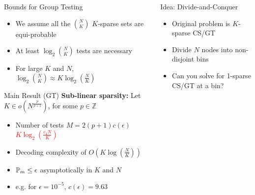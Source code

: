 \documentclass[final]{beamer}
\newlength{\onecolwid}
\newlength{\twocolwid}
\newlength{\blockskip}
\newlength{\negativeskip}
\begin{document}
\begin{frame}
\begin{columns}[t]
\begin{column}{\onecolwid}
    \begin{block}{\Large Bounds for Group Testing}
		\begin{itemize}
			 \item We assume all the $\binom{N}{K}$ $K$-sparse sets are equi-probable
			 \item At least $\log_2 \binom{N}{K}$ tests are necessary
			 \item For large $K$ and $N$, $\log_2 \binom{N}{K}\approx K\log_2(\frac{N}{K})$
	 \end{itemize}
	 
	 
   \begin{alertblock}{\Large Main Result (GT)} 
	    \textbf{Sub-linear sparsity: }Let $K\in o(N^{\frac{p}{p+1}})$, for some $p\in\mathbb{Z}$
			\begin{itemize}
			\itemsep10pt
				\item Number of tests  $M=2(p+1)c(\epsilon)$ \textcolor{red}{$K\log_2 (\frac{c_1N}{K})$}
				\item Decoding complexity of $O\left(K\log(\frac{N}{K})\right)$ 
				\item $\mathbb{P}_{m}\leq \epsilon$ asymptotically in $K$ and $N$
				\item e.g. for $\epsilon=10^{-5}$, $c(\epsilon)=9.63$
			\end{itemize}
    	\end{alertblock}
	 \end{block}
  \end{column}

  \begin{column}{\twocolwid}
    \vspace{\negativeskip}

    \begin{block}{\Large Idea: Divide-and-Conquer}
    \begin{itemize}
		\item Original problem is $K$-sparse CS/GT  
    	\item Divide $N$ nodes into non-disjoint bins
	    \item Can you solve for 1-sparse CS/GT at a bin?
    \end{itemize}

    \begin{figure}
       \center
		\scalebox{1.3}{}
	\end{figure}

    \end{block}
    \vspace{\blockskip}


\end{column}
\end{columns}
\end{frame}
\end{document}
